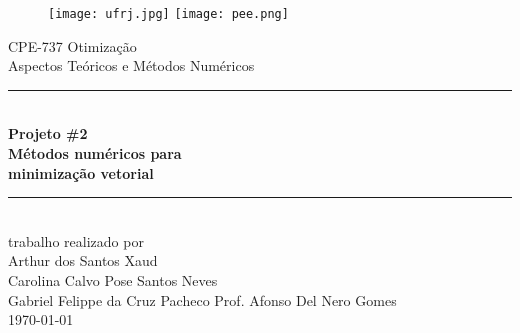 \thispagestyle{empty}
\begin{center}
\begin{figure}[h!]
	\texttt{[image: ufrj.jpg]}
	\hfill
	\texttt{[image: pee.png]}
\end{figure}
\vfill
{\Huge CPE-737 Otimização \\ {\huge Aspectos Teóricos e Métodos Numéricos}}
\vspace{15pt}
\vfill
\rule[2mm]{150mm}{0.2mm}\\
{\bf {\huge Projeto \#2 \\ }
\vspace{0.2cm}
{\Large Métodos numéricos para \\minimização vetorial\\ }
\vspace{0.1cm}}
\rule[-2mm]{150mm}{0.2mm}\\
\vfill
trabalho realizado por \\
\vspace{15pt}
{\large  Arthur {\sc dos Santos Xaud}} \\
{\large  Carolina {\sc Calvo Pose Santos Neves}} \\
{\large  Gabriel {\sc Felippe da Cruz Pacheco}}
\vfill
{ Prof. Afonso {\sc Del Nero Gomes} \\ \vspace{5pt} \today}\\
\end{center}

